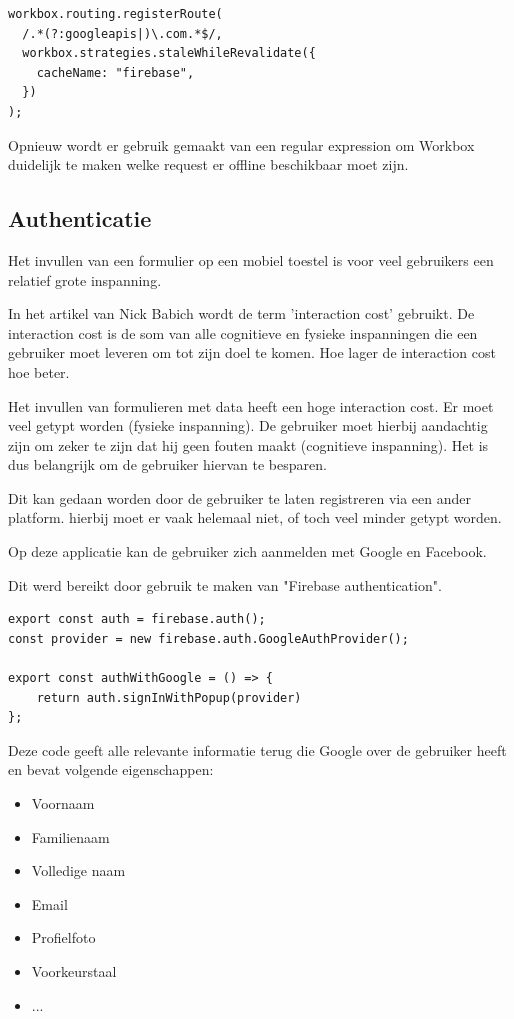 \begin{lstlisting}
workbox.routing.registerRoute(
  /.*(?:googleapis|)\.com.*$/,
  workbox.strategies.staleWhileRevalidate({
    cacheName: "firebase",
  })
);
\end{lstlisting}
		
		Opnieuw wordt er gebruik gemaakt van een regular expression om Workbox duidelijk te maken welke request er offline beschikbaar moet zijn.

	\subsection{Authenticatie}
		
		Het invullen van een formulier op een mobiel toestel is voor veel gebruikers een relatief grote inspanning.
		
		In het artikel van Nick Babich wordt de term 'interaction cost' gebruikt. De interaction cost is de som van alle cognitieve en fysieke inspanningen die een gebruiker moet leveren om tot zijn doel te komen. Hoe lager de interaction cost hoe beter.
		\autocite{Babich2018}
		
		Het invullen van formulieren met data heeft een hoge interaction cost. Er moet veel getypt worden (fysieke inspanning). De gebruiker moet hierbij aandachtig zijn om zeker te zijn dat hij geen fouten maakt (cognitieve inspanning). Het is dus belangrijk om de gebruiker hiervan te besparen.
		
		Dit kan gedaan worden door de gebruiker te laten registreren via een ander platform. hierbij moet er vaak helemaal niet, of toch veel minder getypt worden.
		
		Op deze applicatie kan de gebruiker zich aanmelden met Google en Facebook.
		
		Dit werd bereikt door gebruik te maken van "Firebase authentication".
		
		
\begin{lstlisting}
export const auth = firebase.auth();
const provider = new firebase.auth.GoogleAuthProvider();

export const authWithGoogle = () => {
	return auth.signInWithPopup(provider)
};
\end{lstlisting}
	
		Deze code geeft alle relevante informatie terug die Google over de gebruiker heeft en bevat volgende eigenschappen:
		\begin{itemize}
			\item Voornaam
			\item Familienaam
			\item Volledige naam
			\item Email
			\item Profielfoto
			\item Voorkeurstaal
			\item ...
		\end{itemize} 
		
